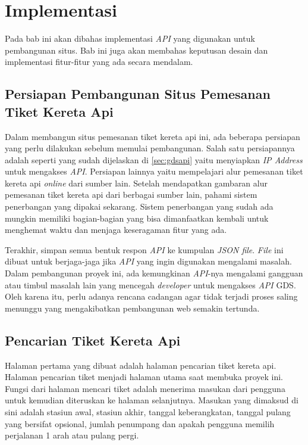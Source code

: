 \chapter{Implementasi}
\label{chap:implementasi}
Pada bab ini akan dibahas implementasi \textit{API} yang digunakan untuk pembangunan situs. Bab ini juga akan membahas keputusan desain dan implementasi fitur-fitur yang ada secara mendalam.

\section{Persiapan Pembangunan Situs Pemesanan Tiket Kereta Api}

Dalam membangun situs pemesanan tiket kereta api ini, ada beberapa persiapan yang perlu dilakukan sebelum memulai pembangunan. Salah satu persiapannya adalah seperti yang sudah dijelaskan di \ref{sec:gdsapi} yaitu menyiapkan \textit{IP Address} untuk mengakses \textit{API}. Persiapan lainnya yaitu mempelajari alur pemesanan tiket kereta api \textit{online} dari sumber lain. Setelah mendapatkan gambaran alur pemesanan tiket kereta api dari berbagai sumber lain, pahami sistem penerbangan yang dipakai sekarang. Sistem penerbangan yang sudah ada mungkin memiliki bagian-bagian yang bisa dimanfaatkan kembali untuk menghemat waktu dan menjaga keseragaman fitur yang ada.

Terakhir, simpan semua bentuk respon \textit{API} ke kumpulan \textit{JSON file}. \textit{File} ini dibuat untuk berjaga-jaga jika \textit{API} yang ingin digunakan mengalami masalah. Dalam pembangunan proyek ini, ada kemungkinan \textit{API}-nya mengalami gangguan atau timbul masalah lain yang mencegah \textit{developer} untuk mengakses \textit{API} GDS. Oleh karena itu, perlu adanya rencana cadangan agar tidak terjadi proses saling menunggu yang mengakibatkan pembangunan web semakin tertunda.

\section{Pencarian Tiket Kereta Api}
\label{sec:pencariantiket} 
 
 Halaman pertama yang dibuat adalah halaman pencarian tiket kereta api. Halaman pencarian tiket menjadi halaman utama saat membuka proyek ini. Fungsi dari halaman mencari tiket adalah menerima masukan dari pengguna untuk kemudian diteruskan ke halaman selanjutnya. Masukan yang dimaksud di sini adalah stasiun awal, stasiun akhir, tanggal keberangkatan, tanggal pulang yang bersifat opsional, jumlah penumpang dan apakah pengguna memilih perjalanan 1 arah atau pulang pergi.
 
